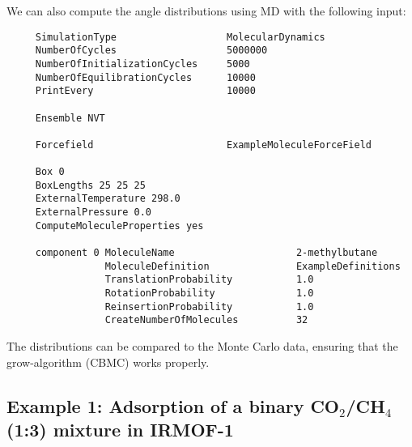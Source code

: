 We can also compute the angle distributions using MD with the following input:
\begin{tiny}
\begin{verbatim}
     SimulationType                   MolecularDynamics
     NumberOfCycles                   5000000
     NumberOfInitializationCycles     5000
     NumberOfEquilibrationCycles      10000
     PrintEvery                       10000

     Ensemble NVT

     Forcefield                       ExampleMoleculeForceField

     Box 0
     BoxLengths 25 25 25
     ExternalTemperature 298.0
     ExternalPressure 0.0
     ComputeMoleculeProperties yes

     component 0 MoleculeName                     2-methylbutane
                 MoleculeDefinition               ExampleDefinitions
                 TranslationProbability           1.0
                 RotationProbability              1.0
                 ReinsertionProbability           1.0
                 CreateNumberOfMolecules          32
\end{verbatim}
\end{tiny}
The distributions can be compared to the Monte Carlo data, ensuring that the grow-algorithm (CBMC) works properly.


\subsection*{Example 1: Adsorption of a binary CO$_2$/CH$_4$ (1:3) mixture in IRMOF-1}

